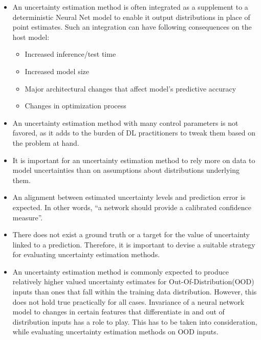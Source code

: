     \begin{itemize}
    	\item An uncertainty estimation method is often integrated as a supplement to a deterministic Neural Net model to enable it output distributions in place of point estimates. Such an integration can have following consequences on the host model:
    	\begin{itemize}
		\item Increased inference/test time
		\item Increased model size
		\item Major architectural changes that affect model's predictive accuracy
		\item Changes in optimization process
    	\end{itemize}
    	\item An uncertainty estimation method with many control parameters is not favored, as it adds to the burden of DL practitioners to tweak them based on the problem at hand.
    	\item It is important for an uncertainty estimation method to rely more on data to model uncertainties than on assumptions about distributions underlying them.
    	\item An alignment between estimated uncertainty levels and prediction error is expected. In other words, \enquote{a network should provide a calibrated confidence measure}\cite{guo2017on}.
    	\item There does not exist a ground truth or a target for the value of uncertainty linked to a prediction. Therefore, it is important to devise a suitable strategy for evaluating uncertainty estimation methods.
    	\item An uncertainty estimation method is commonly expected to produce relatively higher valued uncertainty estimates for Out-Of-Distribution(OOD) inputs than ones that fall within the training data distribution. However, this does not hold true practically for all cases. Invariance of a neural network model to changes in certain features that differentiate in and out of distribution inputs has a role to play. This has to be taken into consideration, while evaluating uncertainty estimation methods on OOD inputs.
        \end{itemize}

